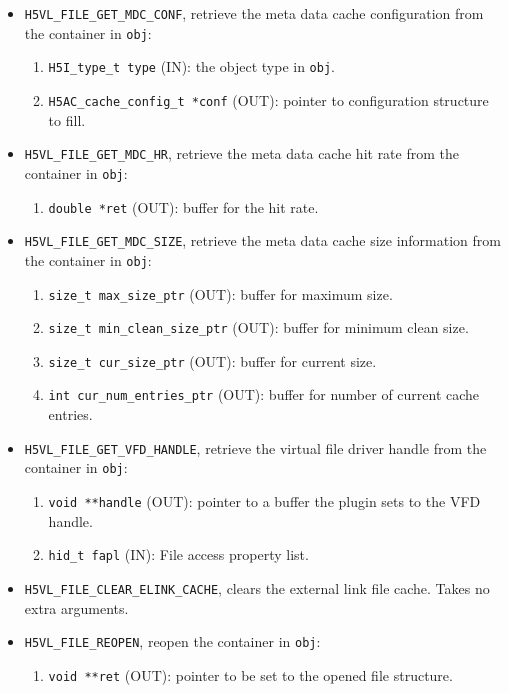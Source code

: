 \begin{itemize}
\item {\tt H5VL\_FILE\_GET\_MDC\_CONF}, retrieve the meta data cache
  configuration from the container in {\tt obj}:
  \begin{enumerate}
  \item {\tt H5I\_type\_t type} (IN): the object type in {\tt obj}.
  \item {\tt H5AC\_cache\_config\_t *conf} (OUT): pointer to
    configuration structure to fill.
  \end{enumerate}

\item {\tt H5VL\_FILE\_GET\_MDC\_HR}, retrieve the meta data cache
  hit rate from the container in {\tt obj}:
  \begin{enumerate}
  \item {\tt double *ret} (OUT): buffer for the hit rate.
  \end{enumerate}

\item {\tt H5VL\_FILE\_GET\_MDC\_SIZE}, retrieve the meta data cache
  size information from the container in {\tt obj}:
  \begin{enumerate}
  \item {\tt size\_t max\_size\_ptr} (OUT): buffer for maximum size.
  \item {\tt size\_t min\_clean\_size\_ptr} (OUT): buffer for minimum
    clean size.
  \item {\tt size\_t cur\_size\_ptr} (OUT): buffer for current size.
  \item {\tt int cur\_num\_entries\_ptr} (OUT): buffer for number of
    current cache entries.
  \end{enumerate}

\item {\tt H5VL\_FILE\_GET\_VFD\_HANDLE}, retrieve the virtual file
  driver handle from the container in {\tt obj}:
  \begin{enumerate}
  \item {\tt void **handle} (OUT): pointer to a buffer the plugin sets
    to the VFD handle.
  \item {\tt hid\_t fapl} (IN): File access property list.
  \end{enumerate}

\item {\tt H5VL\_FILE\_CLEAR\_ELINK\_CACHE}, clears the external link
  file cache. Takes no extra arguments.

\item {\tt H5VL\_FILE\_REOPEN}, reopen the container in {\tt obj}:
  \begin{enumerate}
  \item {\tt void **ret} (OUT): pointer to be set to the opened file
    structure.
  \end{enumerate}


\end{itemize}

